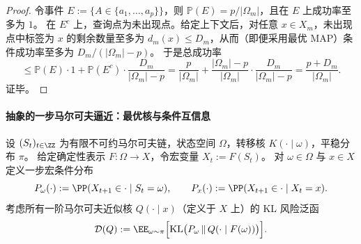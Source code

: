 \begin{proof}
令事件 \(E:=\{A\in\{a_1,\dots,a_p\}\}\)，则 \(\mathbb P(E)=p/|\Omega_m|\)，且在 \(E\) 上成功率至多为 \(1\)。
在 \(E^c\) 上，查询点为未出现点。给定上下文后，对任意 \(x\in X_m\)，未出现点中标签为 \(x\) 的剩余数量至多为 \(d_m(x)\le D_m\)，从而（即便采用最优 MAP）条件成功率至多为 \(D_m/(|\Omega_m|-p)\)。
于是总成功率
\[
\le \mathbb P(E)\cdot 1+\mathbb P(E^c)\cdot \frac{D_m}{|\Omega_m|-p}
=\frac{p}{|\Omega_m|}+\frac{|\Omega_m|-p}{|\Omega_m|}\cdot\frac{D_m}{|\Omega_m|-p}
=\frac{p+D_m}{|\Omega_m|}.
\]
证毕。
\end{proof}

\paragraph{抽象的一步马尔可夫逼近：最优核与条件互信息}\label{par:op-algebra-fold-markov-closure-cmi}
设 \((S_t)_{t\in\ZZ}\) 为有限不可约马尔可夫链，状态空间 \(\Omega\)，转移核 \(K(\cdot\mid \omega)\)，平稳分布 \(\pi\)。
给定确定性表示 \(F:\Omega\to X\)，令宏变量 \(X_t:=F(S_t)\)。
对 \(\omega\in\Omega\) 与 \(x\in X\) 定义一步宏条件分布
\[
P_\omega(\cdot):=\PP(X_{t+1}\in\cdot\mid S_t=\omega),
\qquad
P_x(\cdot):=\PP(X_{t+1}\in\cdot\mid X_t=x).
\]
考虑所有一阶马尔可夫近似核 \(Q(\cdot\mid x)\)（定义于 \(X\) 上）的 KL 风险泛函
\[
\mathcal D(Q):=\EE_{\omega\sim \pi}\Bigl[\mathrm{KL}\bigl(P_\omega\,\Vert\,Q(\cdot\mid F(\omega))\bigr)\Bigr].
\]

